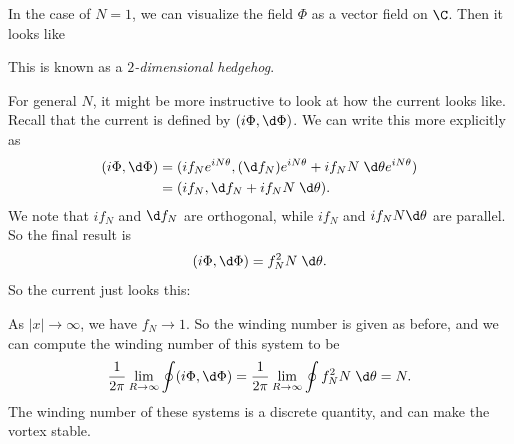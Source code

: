 \documentclass[a4paper]{article}
\begin{document}
In the case of $N = 1$, we can visualize the field $\Phi$ as a vector field on $\C$. Then it looks like
\begin{center}
\end{center}
This is known as a \emph{$2$-dimensional hedgehog}.

For general $N$, it might be more instructive to look at how the current looks like. Recall that the current is defined by $(i\Phi, \d \Phi)$. We can write this more explicitly as
\begin{align*}
  (i\Phi, \d \Phi) &= (if_N e^{iN\theta}, (\d f_N) e^{iN\theta} + i f_N N\;\d \theta e^{iN\theta})\\
  &= (if_N,\d f_N + i f_N N\;\d \theta).
\end{align*}
We note that $if_N$ and $\d f_N$ are orthogonal, while $i f_N$ and $i f_N N \d \theta$ are parallel. So the final result is
\[
  (i\Phi, \d \Phi) = f_N^2 N\;\d \theta.
\]
So the current just looks this:

\begin{center}
\end{center}

As $|x| \to \infty$, we have $f_N \to 1$. So the winding number is given as before, and we can compute the winding number of this system to be
\[
  \frac{1}{2\pi} \lim_{R \to \infty} \oint (i \Phi, \d \Phi) = \frac{1}{2\pi} \lim_{R \to \infty} \oint f_N^2 N \;\d \theta = N.
\]
The winding number of these systems is a discrete quantity, and can make the vortex stable.
\end{document}
